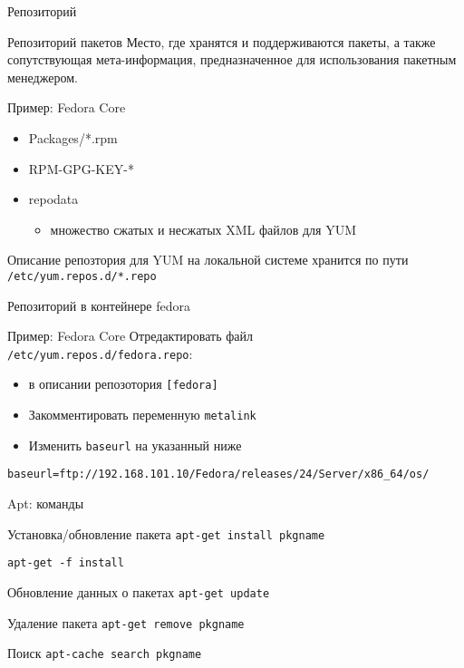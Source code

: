 
\begin{frame}{Репозиторий}
	\begin{block}{Репозиторий пакетов}
		Место, где хранятся и поддерживаются пакеты, а также сопутствующая мета-информация, предназначенное для использования пакетным менеджером.
	\end{block}
	\begin{block}{Пример: Fedora Core}
		\begin{itemize}
			\item Packages/*.rpm
			\item RPM-GPG-KEY-*
			\item repodata
			\begin{itemize}
				\item множество сжатых и несжатых XML файлов для YUM
			\end{itemize}
		\end{itemize}

		Описание репозтория для YUM на локальной системе хранится по пути
		{\tt /etc/yum.repos.d/*.repo}
	\end{block}
\end{frame}


\begin{frame}[fragile]{Репозиторий в контейнере fedora}
	\begin{block}{Пример: Fedora Core}
	    Отредактировать файл \\
		        {\tt /etc/yum.repos.d/fedora.repo}:
		\begin{itemize}
		    \item в описании репозотория {\tt [fedora]}
		    \item Закомментировать переменную {\tt metalink}
		    \item Изменить {\tt baseurl} на указанный ниже
		\end{itemize}
	\end{block}
	\begin{verbatim}
baseurl=ftp://192.168.101.10/Fedora/releases/24/Server/x86_64/os/
	\end{verbatim}
\end{frame}

\begin{frame}{Apt: команды}
	\begin{block}{Установка/обновление пакета}
		{\tt apt-get install pkgname }

                {\tt apt-get -f install}
	\end{block}
	\begin{block}{Обновление данных о пакетах}
		{\tt apt-get update }
	\end{block}
	\begin{block}{Удаление пакета}
		{\tt apt-get remove pkgname }
	\end{block}
	\begin{block}{Поиск}
		{\tt apt-cache search pkgname }
	\end{block}
\end{frame}

